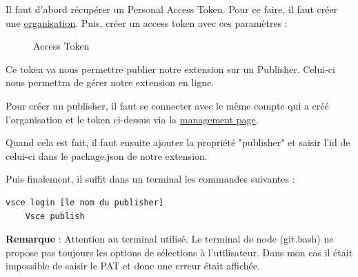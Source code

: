 \documentclass[
    iict, %
    il, %
]{heig-tb}
\begin{document}
Il faut d'abord récupérer un Personal Access Token. Pour ce faire, il faut créer une \href{https://docs.microsoft.com/en-us/azure/devops/organizations/accounts/create-organization?view=azure-devops}{organisation}.
Puis, créer un access token avec ces paramètres :
\begin{figure}[!h]
    \begin{center}
    \end{center}
    \caption[Access Token]{\label{access-token}Access Token}
\end{figure}

Ce token va nous permettre publier notre extension sur un Publisher. Celui-ci nous permettra de gérer notre extension en ligne.

Pour créer un publisher, il faut se connecter avec le même compte qui a créé l'organisation et le token ci-dessus via la \href{https://marketplace.visualstudio.com/manage/publishers/}{management page}.

Quand cela est fait, il faut ensuite ajouter la propriété "publisher" et saisir l'id de celui-ci dans le package.json de notre extension.

Puis finalement, il suffit dans un terminal les commandes suivantes :
\begin{lstlisting}[frame=single]
    vsce login [le nom du publisher]
    Vsce publish
\end{lstlisting}

\textbf{Remarque} : Attention au terminal utilisé. Le terminal de node (git.bash) ne propose pas toujours les options de sélections à l'utilisateur. Dans mon cas il était impossible de saisir le PAT et donc une erreur était affichée.
\end{document}
